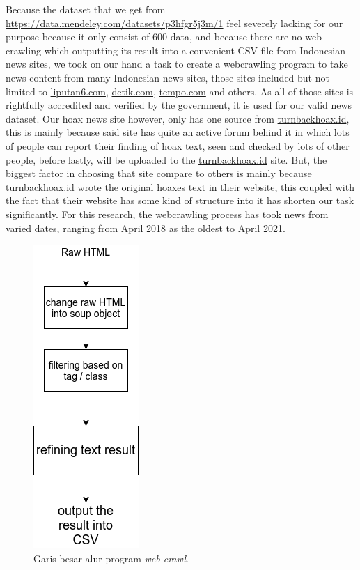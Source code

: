 Because the dataset that we get from \url{https://data.mendeley.com/datasets/p3hfgr5j3m/1} feel severely lacking for our purpose because it only consist of 600 data, and because there are no web crawling which outputting its result into a convenient CSV file from Indonesian news sites, we took on our hand a task to create a webcrawling program to take news content from many Indonesian news sites, those sites included but not limited to \url{liputan6.com}, \url{detik.com}, \url{tempo.com} and others. As all of those sites is rightfully accredited and verified by the government, it is used for our valid news dataset. Our hoax news site however, only has one source from \url{turnbackhoax.id}, this is mainly because said site has quite an active forum behind it in which lots of people can report their finding of hoax text, seen and checked by lots of other people, before lastly, will be uploaded to the \url{turnbackhoax.id} site. But, the biggest factor in choosing that site compare to others is mainly because \url{turnbackhoax.id} wrote the original hoaxes text in their website, this coupled with the fact that their website has some kind of structure into it has shorten our task significantly. For this research, the webcrawling process has took news from varied dates, ranging from April 2018 as the oldest to April 2021.

\begin{figure} [h!]
    \centering
    \includegraphics[width=0.35\linewidth]{gambar/webcrawl method_long_en.png}
    \caption{Garis besar alur program \textit{web crawl}.}
    \label{fig:webcrawl_method}
\end{figure}

